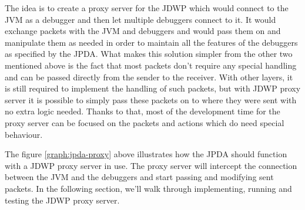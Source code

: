 \documentclass[..thesis.tex]{subfiles}
\begin{document}
The idea is to create a proxy server for the JDWP which would connect to the JVM as a debugger and then let multiple debuggers connect to it.
It would exchange packets with the JVM and debuggers and would pass them on and manipulate them as needed in order to maintain all the features of the debuggers as specified by the JPDA.
What makes this solution simpler from the other two mentioned above is the fact that most packets don't require any special handling and can be passed directly from the sender to the receiver.
With other layers, it is still required to implement the handling of such packets, but with JDWP proxy server it is possible to simply pass these packets on to where they were sent with no extra logic needed.
Thanks to that, most of the development time for the proxy server can be focused on the packets and actions which do need special behaviour.



The figure \ref{graph:jpda-proxy} above illustrates how the JPDA should function with a JDWP proxy server in use.
The proxy server will intercept the connection between the JVM and the debuggers and start passing and modifying sent packets.
In the following section, we'll walk through implementing, running and testing the JDWP proxy server.
\end{document}
